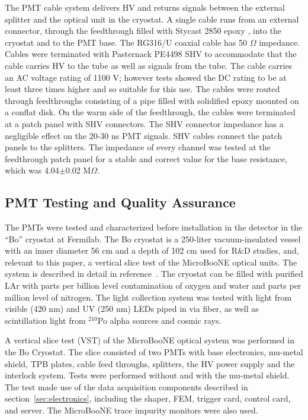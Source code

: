 The PMT cable system delivers HV and returns signals between the external splitter and the optical unit in the cryostat.   A single cable runs from an external connector, through the feedthrough filled with Stycast 2850 epoxy \cite{stycast}, into the cryostat and to the PMT base. The RG316/U coaxial cable has 50 $\Omega$ impedance.  Cables were terminated with Pasternack PE4498 SHV to accommodate that the cable carries HV to the tube as well as signals from the tube.
The cable carries an AC voltage rating of 1100 V; however tests showed the DC rating to be at least three times higher and so suitable for this use.  The cables were routed through feedthroughs consisting of a pipe filled with solidified epoxy mounted on a conflat disk.  On the warm side of the feedthrough, the cables were terminated at a patch panel with SHV connectors. The SHV connector impedance has a negligible effect on the 20-30 ns PMT signals.  SHV cables connect the patch panels to the splitters.  The impedance of every channel was tested at the feedthrough patch panel for a stable and correct value for the base resistance, which was 4.04$\pm$0.02 M$\Omega$. 

\subsection{PMT Testing and Quality Assurance}

The PMTs were tested and characterized before installation in the detector in the ``Bo'' cryostat at Fermilab.  The Bo cryostat is a 250-liter vacuum-insulated vessel with an inner diameter 56 cm and a depth of 102 cm used for R\&D studies, and, relevant to this paper, a vertical slice test of the MicroBooNE optical units.  The system is described in detail in reference~\cite{Jones:2015bya}.  The cryostat can be filled with purified LAr with parts per billion level contamination of oxygen and water and parts per million level of nitrogen.  The light collection system was tested with light from visible (420 nm) and UV (250 nm) LEDs piped in via fiber, as well as scintillation light from $^{210}$Po alpha sources and cosmic rays.

A vertical slice test (VST) of the MicroBooNE optical system was performed in the Bo Cryostat.  The slice consisted of two PMTs with base electronics, mu-metal shield, TPB plates,  cable feed throughs, splitters, the HV power supply and the interlock system.   Tests were performed without and with the mu-metal shield.   The test made use of the data acquisition components described in section~\ref{sec:electronics}, including the shaper, FEM, trigger card, control card, and server.  The MicroBooNE trace impurity monitors were also used.

